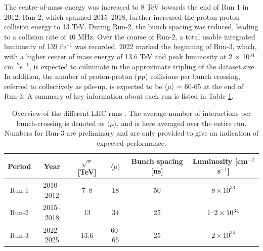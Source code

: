 The centre-of-mass energy was increased to 8 TeV towards the end of Run 1 in 2012. Run-2, which spanned 2015–2018, further increased the proton-proton collision energy to 13 TeV. During Run-2, the bunch spacing was reduced, leading to a collision rate of 40 MHz. Over the course of Run-2, a total usable integrated luminosity of 139 fb$^{−1}$ was recorded. 2022 marked the beginning of Run-3, which, with a higher center of mass energy of 13.6 TeV and peak luminosity at 2 $\times$ 10$^{34}$ cm$^{−2}$s$^{−1}$, is expected to culminate in the approximate tripling of the dataset size. In addition, the number of proton-proton (pp) collisions per bunch crossing, referred to collectively as pile-up, is expected to be $\langle \mu \rangle$ = 60-65 at the end of Run-3. A summary of key information about each run is listed in Table \ref{tab:lhc-runs}.

\begin{table}[!htbp]
  \footnotesize\centering
  \setlength{\tabcolsep}{0.5em} %
  \begin{tabular}{cc|cccc}
      \toprule
      \textbf{Period} & \textbf{Year} & $\sqrt{s}$ [TeV] 
      & $\langle \mu \rangle$ & \textbf{Bunch spacing} [ns] & \textbf{Luminosity} [cm$^{−2}$s$^{−1}$] \\
      \hline
      Run-1 & 2010--2012 & \SIrange[range-phrase=--,range-units=single,range-exponents=combine]{7}{8}{} & 18 & 50 & $8 \times 10^{33}$ \\
      Run-2 & 2015--2018 & \SI{13  }{} & 34 & 25 & $1\textnormal{--}2 \times 10^{34}$ \\
      Run-3 & 2022--2025 & \SI{13.6}{} & 60-65 & 25 & $2 \times 10^{34}$ \\
      \bottomrule
  \end{tabular}
  \caption{
    Overview of the different \ac{LHC} runs \cite{atlas-lumi-run1,atlas-lumi-run2}.
    The average number of interactions per bunch-crossing is denoted as $\langle \mu \rangle$, and is here averaged over the entire run. Numbers for Run-3 are preliminary and are only provided to give an indication of expected performance.
  }
  \label{tab:lhc-runs}
\end{table}

